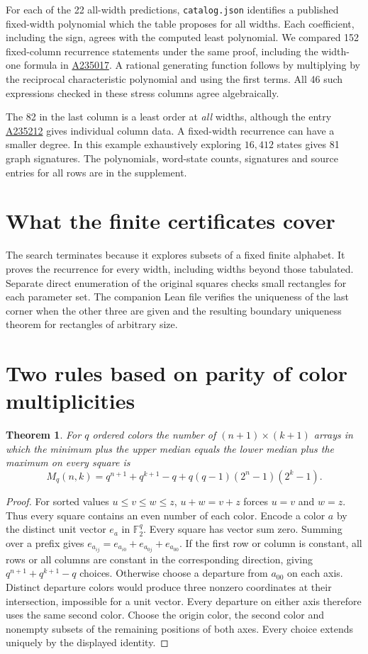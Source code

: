 \documentclass[11pt,letterpaper]{article}
\newtheorem{theorem}{Theorem}[section]
\newcommand{\F}{\mathbb F}
\newcommand{\seqid}[1]{\href{https://oeis.org/A#1}{A#1}}
\begin{document}
For each of the 22 all-width predictions, \texttt{catalog.json} identifies a published fixed-width polynomial which the table proposes for all widths. Each coefficient, including the sign, agrees with the computed least polynomial. We compared 152 fixed-column recurrence statements under the same proof, including the width-one formula in \seqid{235017}. A rational generating function follows by multiplying by the reciprocal characteristic polynomial and using the first terms. All 46 such expressions checked in these stress columns agree algebraically.

The 82 in the last column is a least order at \emph{all} widths, although the entry \seqid{235212} gives individual column data. A fixed-width recurrence can have a smaller degree. In this example exhaustively exploring $16{,}412$ states gives 81 graph signatures. The polynomials, word-state counts, signatures and source entries for all rows are in the supplement.

\section*{What the finite certificates cover}
The search terminates because it explores subsets of a fixed finite alphabet. It proves the recurrence for every width, including widths beyond those tabulated. Separate direct enumeration of the original squares checks small rectangles for each parameter set. The companion Lean file verifies the uniqueness of the last corner when the other three are given and the resulting boundary uniqueness theorem for rectangles of arbitrary size.

\clearpage
\section{Two rules based on parity of color multiplicities}\label{sec:parity}

\begin{theorem}\label{th:median}
For $q$ ordered colors the number of $(n+1)\times(k+1)$ arrays in which the minimum plus the upper median equals the lower median plus the maximum on every square is
\[
 M_q(n,k)=q^{n+1}+q^{k+1}-q+q(q-1)(2^n-1)(2^k-1).
\]
\end{theorem}
\begin{proof}
For sorted values $u\le v\le w\le z$, $u+w=v+z$ forces $u=v$ and $w=z$. Thus every square contains an even number of each color. Encode a color $a$ by the distinct unit vector $e_a$ in $\F_2^q$. Every square has vector sum zero. Summing over a prefix gives
$e_{a_{ij}}=e_{a_{i0}}+e_{a_{0j}}+e_{a_{00}}$.
If the first row or column is constant, all rows or all columns are constant in the corresponding direction, giving $q^{n+1}+q^{k+1}-q$ choices. Otherwise choose a departure from $a_{00}$ on each axis. Distinct departure colors would produce three nonzero coordinates at their intersection, impossible for a unit vector. Every departure on either axis therefore uses the same second color. Choose the origin color, the second color and nonempty subsets of the remaining positions of both axes. Every choice extends uniquely by the displayed identity.
\end{proof}
\end{document}
